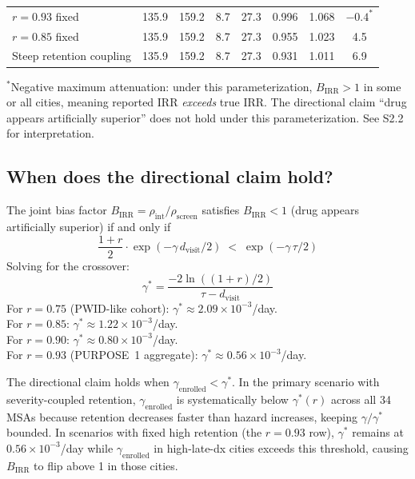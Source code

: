 \documentclass[11pt]{article}
\begin{document}
\begin{table}[H]
\begin{tabular}{lccccccc}
$r = 0.93$ fixed               & 135.9 & 159.2 & 8.7  & 27.3 & 0.996 & 1.068 & $-0.4^*$ \\
$r = 0.85$ fixed               & 135.9 & 159.2 & 8.7  & 27.3 & 0.955 & 1.023 & 4.5 \\
Steep retention coupling       & 135.9 & 159.2 & 8.7  & 27.3 & 0.931 & 1.011 & 6.9 \\
\bottomrule
\end{tabular}
\vspace{0.3em}
\footnotesize
\begin{flushleft}
$^*$Negative maximum attenuation: under this parameterization, $B_{\mathrm{IRR}} > 1$ in some or all cities, meaning reported IRR \emph{exceeds} true IRR. The directional claim ``drug appears artificially superior'' does not hold under this parameterization. See S2.2 for interpretation.
\end{flushleft}
\end{table}

\subsection{When does the directional claim hold?}

The joint bias factor $B_{\mathrm{IRR}} = \rho_{\mathrm{int}}/\rho_{\mathrm{screen}}$ satisfies $B_{\mathrm{IRR}} < 1$ (drug appears artificially superior) if and only if
\begin{equation}
\frac{1+r}{2} \cdot \exp(-\gamma\, d_{\mathrm{visit}}/2) \;<\; \exp(-\gamma\,\tau/2)
\end{equation}
Solving for the crossover:
\begin{equation}
\gamma^* = \frac{-2\ln((1+r)/2)}{\tau - d_{\mathrm{visit}}}
\end{equation}
For $r = 0.75$ (PWID-like cohort): $\gamma^* \approx 2.09 \times 10^{-3}$/day.\\
For $r = 0.85$: $\gamma^* \approx 1.22 \times 10^{-3}$/day.\\
For $r = 0.90$: $\gamma^* \approx 0.80 \times 10^{-3}$/day.\\
For $r = 0.93$ (PURPOSE~1 aggregate): $\gamma^* \approx 0.56 \times 10^{-3}$/day.

The directional claim holds when $\gamma_{\mathrm{enrolled}} < \gamma^*$. In the primary scenario with severity-coupled retention, $\gamma_{\mathrm{enrolled}}$ is systematically below $\gamma^*(r)$ across all 34 MSAs because retention decreases faster than hazard increases, keeping $\gamma/\gamma^*$ bounded. In scenarios with fixed high retention (the $r = 0.93$ row), $\gamma^*$ remains at $0.56 \times 10^{-3}$/day while $\gamma_{\mathrm{enrolled}}$ in high-late-dx cities exceeds this threshold, causing $B_{\mathrm{IRR}}$ to flip above 1 in those cities.
\end{document}
